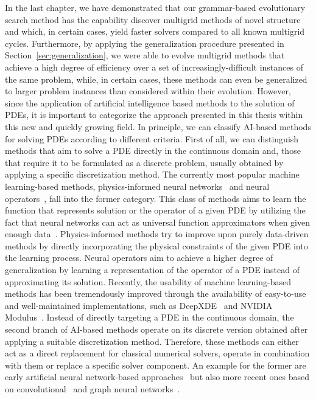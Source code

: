 In the last chapter, we have demonstrated that our grammar-based evolutionary search method has the capability discover multigrid methods of novel structure and which, in certain cases, yield faster solvers compared to all known multigrid cycles.
Furthermore, by applying the generalization procedure presented in  Section~\ref{sec:generalization}, we were able to evolve multigrid methods that achieve a high degree of efficiency over a set of increasingly-difficult instances of the same problem, while, in certain cases, these methods can even be generalized to larger problem instances than considered within their evolution.
However, since the application of artificial intelligence based methods to the solution of PDEs, it is important to categorize the approach presented in this thesis within this new and quickly growing field.
In principle, we can classify AI-based methods for solving PDEs according to different criteria.
First of all, we can distinguish methods that aim to solve a PDE directly in the continuous domain and, those that require it to be formulated as a discrete problem, usually obtained by applying a specific discretization method.
The currently most popular machine  learning-based methods, physics-informed neural networks~\cite{karniadakis2021physics,raissi2019physics,kharazmi2019variational,kharazmi2021hp} and neural operators~\cite{li2020fourier,guibas2021efficient,lu2021learning,li2021physics}, fall into the former category.
This class of methods aims to learn the function that represents solution or the operator of a given PDE by utilizing the fact that neural networks can act as universal function approximators when given enough data~\cite{hornik1989multilayer}.
Physics-informed methods try to improve upon purely data-driven methods by directly incorporating the physical constraints of the given PDE into the learning process.
Neural operators aim to achieve a higher degree of generalization by learning a representation of the operator of a PDE instead of approximating its solution.
Recently, the usability of machine learning-based methods has been tremendously improved through the availability of easy-to-use and well-maintained implementations, such as DeepXDE~\cite{lu2021deepxde} and NVIDIA Modulus~\cite{hennigh2021nvidia}. 
Instead of directly targeting a PDE in the continuous domain, the second branch of AI-based methods operate on its discrete version obtained after applying a suitable discretization method.
Therefore, these methods can either act as a direct replacement for classical numerical solvers, operate in combination with them or replace a specific solver component.
An example for the former are early artificial neural network-based approaches~\cite{lagaris1998artificial} but also more recent  ones based on convolutional~\cite{thuerey2020deep} and graph neural networks~\cite{pfaff2020learning}. 
